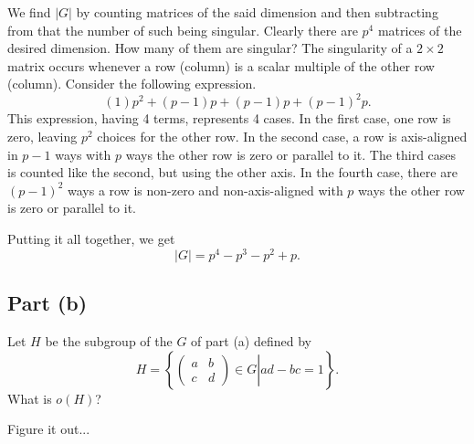 \documentclass[12pt]{article}
\begin{document}
We find $|G|$ by counting matrices of the said dimension and then subtracting from that the number of
such being singular.  Clearly there are $p^4$ matrices of the desired dimension.  How many of them are singular?
The singularity of a $2\times 2$ matrix occurs whenever a row (column) is a scalar multiple of the other row (column).
Consider the following expression.
\begin{equation*}
(1)p^2 + (p-1)p + (p-1)p + (p-1)^2p.
\end{equation*}
This expression, having 4 terms, represents 4 cases.  In the first case, one row is zero, leaving $p^2$ choices
for the other row.  In the second case, a row is axis-aligned in $p-1$ ways with $p$ ways the other row
is zero or parallel to it.  The third cases is counted like the second, but using the other axis.  In the fourth case,
there are $(p-1)^2$ ways a row is non-zero and non-axis-aligned with $p$ ways the other row is zero or parallel to it.

Putting it all together, we get
\begin{equation*}
|G| = p^4 - p^3 - p^2 + p.
\end{equation*}

\subsection*{Part (b)}

Let $H$ be the subgroup of the $G$ of part (a) defined by
\begin{equation*}
H = \left\{\left.\left(\begin{array}{cc}a&b\\c&d\end{array}\right)\in G\right|ad-bc=1\right\}.
\end{equation*}
What is $o(H)$?

Figure it out...
\end{document}
